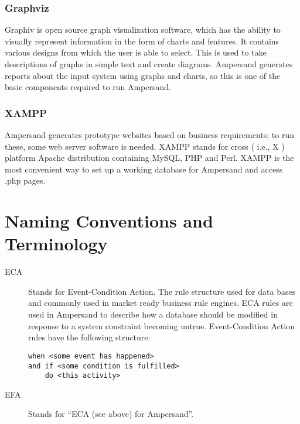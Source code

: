 \documentclass[12pt]{report}
\begin{document}
\subsubsection*{Graphviz}
Graphiv is open source graph visualization software, which has the ability to
visually represent information in the form of charts and features. It contains
various designs from which the user is able to select. This is used to take
descriptions of graphs in simple text and create diagrams. Ampersand generates
reports about the input system using graphs and charts, so this is one of the
basic components required to run Ampersand.

\subsubsection*{XAMPP}
Ampersand generates prototype websites based on business requirements; to run
these, some web server software is needed. XAMPP stands for cross \big( i.e., X
\big) platform Apache distribution containing MySQL, PHP and Perl. XAMPP is the
most convenient way to set up a working database for Ampersand and access .php
pages. %

%
\section{Naming Conventions and Terminology}\label{sec:Naming} 
\begin{description}
\item[ECA] Stands for Event-Condition Action. The rule structure used for data
  bases and commonly used in market ready business rule engines. ECA rules are
  used in Ampersand to describe how a database should be modified in response to
  a system constraint becoming untrue. Event-Condition Action rules have
  the following structure:
\begin{verbatim}
when <some event has happened> 
and if <some condition is fulfilled> 
    do <this activity>
\end{verbatim} %
\item [EFA] Stands for ``ECA (see above) for Ampersand''.
\end{description}
\end{document}
